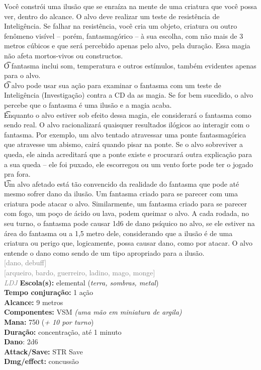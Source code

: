 \documentclass{RPG_Adventure}[2021/10/20]
\begin{document}
{\normalsize Você constrói uma ilusão que se enraíza na mente de uma criatura que você possa ver, dentro do alcance. O alvo deve realizar um teste de resistência de Inteligência. Se falhar na resistência, você cria um objeto, criatura ou outro fenômeno visível – porém, fantasmagórico – à sua escolha, com não mais de 3 metros cúbicos e que será percebido apenas pelo alvo, pela duração. Essa magia não afeta mortos-vivos ou constructos.\\\t O fantasma inclui som, temperatura e outros estímulos, também evidentes apenas para o alvo.\\\t O alvo pode usar sua ação para examinar o fantasma com um teste de Inteligência (Investigação) contra a CD da as magia. Se for bem sucedido, o alvo percebe que o fantasma é uma ilusão e a magia acaba.\\\t Enquanto o alvo estiver sob efeito dessa magia, ele considerará o fantasma como sendo real. O alvo racionalizará quaisquer resultados ilógicos ao interagir com o fantasma. Por exemplo, um alvo tentado atravessar uma ponte fantasmagórica que atravesse um abismo, cairá quando pisar na ponte. Se o alvo sobreviver a queda, ele ainda acreditará que a ponte existe e procurará outra explicação para a sua queda – ele foi puxado, ele escorregou ou um vento forte pode ter o jogado pra fora.\\\t Um alvo afetado está tão convencido da realidade do fantasma que pode até mesmo sofrer dano da ilusão. Um fantasma criado para se parecer com uma criatura pode atacar o alvo. Similarmente, um fantasma criado para se parecer com fogo, um poço de ácido ou lava, podem queimar o alvo. A cada rodada, no seu turno, o fantasma pode causar 1d6 de dano psíquico no alvo, se ele estiver na área do fantasma ou a 1,5 metro dele, considerando que a ilusão é de uma criatura ou perigo que, logicamente, possa causar dano, como por atacar. O alvo entende o dano como sendo de um tipo apropriado para a ilusão.\\}
{\scriptsize \textcolor{gray}{[dano, debuff]\\}}
{\scriptsize \textcolor{gray}{[arqueiro, bardo, guerreiro, ladino, mago, monge]\\}}
{\tiny \textcolor{gray}{\textit{LDJ}}}
{\small \t \textbf{Escola(s):} elemental (\textit{terra, sombras, metal})\\\t \textbf{Tempo conjuração:} 1 ação\\\t \textbf{Alcance:} 9 metros\\\t \textbf{Componentes:} VSM \textit{(uma mão em miniatura de argila)}\\\t \textbf{Mana:} 750 (\textit{+ 10 por turno})\\\t \textbf{Duração:} concentração, até 1 minuto\\\t \textbf{Dano}: 2d6\\\t \textbf{Attack/Save:} STR Save\\\t \textbf{Dmg/effect:} concussão\\}
\end{document}
